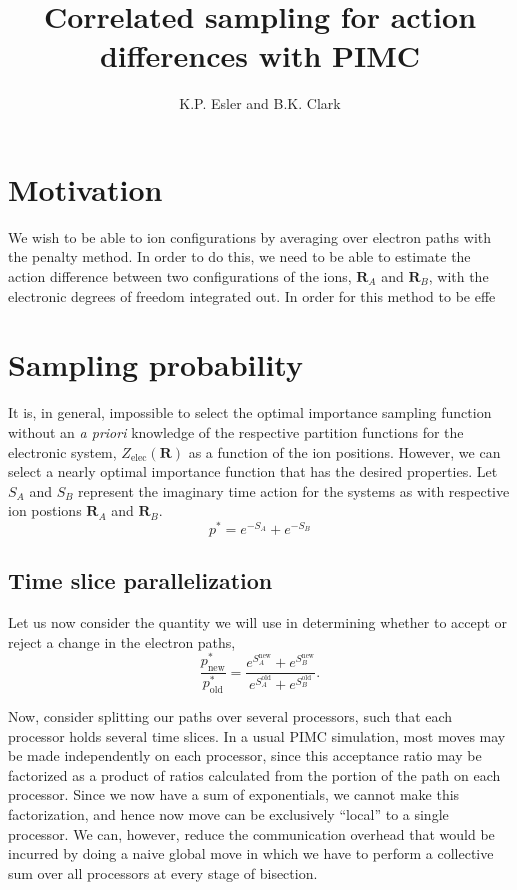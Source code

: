 \documentclass{article}
\title{Correlated sampling for action differences with PIMC}
\author{K.P. Esler and B.K. Clark}
\newcommand{\vR}{\mathbf{R}}
\begin{document}
\maketitle
\section{Motivation}
We wish to be able to ion configurations by averaging over electron
paths with the penalty method.  In order to do this, we need to be
able to estimate the action difference between two configurations of
the ions, $\vR_A$ and $\vR_B$, with the electronic degrees of freedom
integrated out.  In order for this method to be effe

\section{Sampling probability}
It is, in general, impossible to select the optimal importance
sampling function without an {\em a priori} knowledge of the
respective partition functions for the electronic system,
$Z_\text{elec}(\mathbf{R})$ as a function of the ion positions.
However, we can select a nearly optimal importance function that has
the desired properties.  Let $S_A$ and $S_B$ represent the imaginary
time action for the systems as with respective ion postions $\vR_A$
and $\vR_B$.
\begin{equation}
p^* = e^{-S_A} + e^{-S_B}
\end{equation}

\subsection{Time slice parallelization}
Let us now consider the quantity we will use in determining whether to
accept or reject a change in the electron paths,
\begin{equation}
\frac{p^*_\text{new}}{p^*_\text{old}} = 
\frac{e^{S_A^\text{new}} + e^{S_B^\text{new}}}{e^{S_A^\text{old}} +
  e^{S_B^\text{old}}}.
\end{equation}

Now, consider splitting our paths over several processors, such that
each processor holds several time slices.  In a usual PIMC simulation,
most moves may be made independently on each processor, since this
acceptance ratio may be factorized as a product of ratios calculated
from the portion of the path on each processor.  Since we now have a
sum of exponentials, we cannot make this factorization, and hence now
move can be exclusively ``local'' to a single processor.  We can,
however, reduce the communication overhead that would be incurred by
doing a naive global move in which we have to perform a collective sum
over all processors at every stage of bisection.
\end{document}
